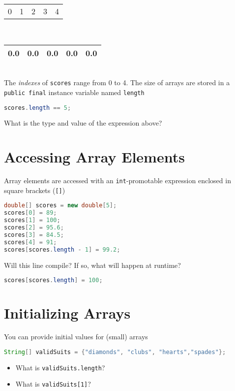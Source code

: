 \documentclass{article}
\begin{document}
\begin{tabular}{p{.5in}p{.5in}p{.5in}p{.5in}p{.5in}}
0 & 1 & 2 & 3 & 4 \\
\end{tabular}\\
\begin{tabular}{|p{.5in}|p{.5in}|p{.5in}|p{.5in}|p{.5in}|}\hline
0.0 & 0.0 & 0.0 & 0.0 & 0.0 \\
\hline
\end{tabular}\\

The {\it indexes} of {\tt scores} range from 0 to 4.  The size of arrays are stored in a {\tt public final} instance variable named {\tt length}

\begin{lstlisting}[language=Java]
scores.length == 5;
\end{lstlisting}
What is the type and value of the expression above?


\section{Accessing Array Elements}


Array elements are accessed with an {\tt int}-promotable expression enclosed in square brackets ({\tt []})
\begin{lstlisting}[language=Java]
double[] scores = new double[5];
scores[0] = 89;
scores[1] = 100;
scores[2] = 95.6;
scores[3] = 84.5;
scores[4] = 91;
scores[scores.length - 1] = 99.2;
\end{lstlisting}



Will this line compile?  If so, what will happen at runtime?
\begin{lstlisting}[language=Java]
scores[scores.length] = 100;
\end{lstlisting}



\section{Initializing Arrays}


You can provide initial values for (small) arrays
\begin{lstlisting}[language=Java]
String[] validSuits = {"diamonds", "clubs", "hearts","spades"};
\end{lstlisting}

\begin{itemize}
\item What is {\tt validSuits.length}?
\item What is {\tt validSuits[1]}?
\end{itemize}
\end{document}
